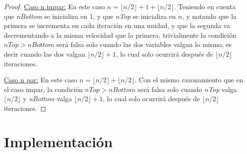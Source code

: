 \documentclass[11pt,a4paper,twoside]{tesis}
\newcommand{\parteEntera}{\lfloor n/2 \rfloor}
\begin{document}
\begin{proof}
\underline{Caso n impar:} En este caso $n = \parteEntera + 1 + \parteEntera$. Teniendo en cuenta que \textit{nBottom} se inicializa en 1, y que \textit{nTop} se inicializa en $n$, y notando que la primera se incrementa en cada iteración en una unidad, y que la segunda va decrementando a la misma velocidad que la primera, trivialmente la condición $nTop > nBottom$ será falsa solo cuando las dos variables valgan lo mismo, es decir cuando las dos valgan $\parteEntera + 1$, lo cual solo ocurrirá después de $\parteEntera$ iteraciones. 

\underline{Caso n par:} En este caso $n = \parteEntera + \parteEntera$. Con el mismo razonamiento que en el caso impar, la condición $nTop > nBottom$ será falsa solo cuando \textit{nTop} valga $\parteEntera$ y \textit{nBottom} valga $\parteEntera + 1$, lo cual solo ocurrirá después de $\parteEntera$ iteraciones. 

\end{proof}

















\chapter{Implementación}
\end{document}
